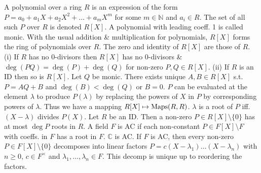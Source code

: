  A polynomial over a ring $R$ is an expression of the form $P = a_0 + a_1X + a_2X^2 + \dots + a_mX^m$ for some $m \in \mathbb{N}$ and $a_i \in R$. The set of all such $P$ over $R$ is denoted $R[X]$. A polynomial with leading coeff. 1 is called monic.
 With the usual addition \& multiplication for polynomials, $R[X]$ forms the ring of polynomials over $R$. The zero and identity of $R[X]$ are those of $R$.
(i) If $R$ has no 0-divisors then $R[X]$ has no 0-divisors \& $\deg(PQ) = \deg(P) + \deg(Q)$ for non-zero $P, Q \in R[X]$.
(ii) If $R$ is an ID then so is $R[X]$.
 Let $Q$ be monic. There exists unique $A, B \in R[X]$ s.t. $P = AQ + B$ and $\deg(B) < \deg(Q)$ or $B = 0$.
 $P$ can be evaluated at the element $\lambda$ to produce $P(\lambda)$ by replacing the powers of $X$ in $P$ by corresponding powers of $\lambda$. Thus we have a mapping $R[X] \mapsto \text{Maps}(R, R)$.
 $\lambda$ is a root of $P$ iff. $(X - \lambda)$ divides $P(X)$.
 Let $R$ be an ID. Then a non-zero $P \in R[X] \setminus \{0\}$ has at most $\deg{P}$ roots in $R$.
 A field $F$ is AC if each non-constant $P \in F[X] \setminus F$ with coeffs. in $F$ has a root in $F$.
 $\mathbb{C}$ is AC. 
 If $F$ is AC, then every non-zero $P \in F[X] \setminus \{0\}$ decomposes into linear factors $P = c(X - \lambda_1) \dots (X - \lambda_n)$ with $n \ge 0$, $c \in F^{\times}$ and $\lambda_1, \dots, \lambda_n \in F$. This decomp is unique up to reordering the factors.
